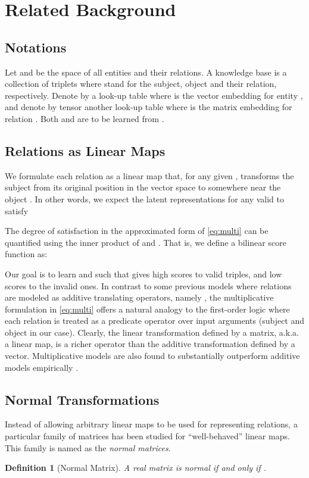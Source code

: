 \documentclass{article}
\newtheorem{definition}{Definition}[section]
\begin{document}
 \section{Related Background}
\label{sec:linearmaps}

\subsection{Notations}
Let  and  be the space of all entities and their relations.
A knowledge base  is a collection of triplets 
where  stand for the subject, object and their relation, respectively.
Denote by  a look-up table where  is the vector embedding for entity ,
and denote by tensor  another look-up table where  is the matrix embedding for relation .
Both  and  are to be learned from .

\subsection{Relations as Linear Maps}
We formulate each relation  as a linear map that,
for any given , transforms the subject  from its original position in the vector space to somewhere near the object .
In other words,
we expect the latent representations for any valid  to satisfy

The degree of satisfaction in the approximated form of  \eqref{eq:multi} can be quantified using
the inner product of  and .
That is, we define a bilinear score function as:

Our goal is to learn  and  such that
 gives high scores to valid triples, and low scores to the invalid ones. 
In contrast to some previous models \cite{bordes2013translating}
where relations are modeled as additive translating operators,
namely ,
the multiplicative formulation in \eqref{eq:multi} offers a natural analogy to the first-order logic where each relation is treated as a predicate operator over input arguments (subject and object in our case).  Clearly, the linear transformation defined by a matrix, a.k.a. a linear map, is a richer operator than the additive transformation defined by a vector.
Multiplicative models are also found to substantially outperform additive models
empirically \cite{nickel2011three, DBLP:journals/corr/YangYHGD14a}.

\subsection{Normal Transformations}
Instead of allowing arbitrary linear maps to be used for representing relations, a particular family of matrices has been studied for ``well-behaved'' linear maps.  This family is named as the \textit{normal matrices}.
\begin{definition}[Normal Matrix]
    A real matrix  is normal if and only if .
\end{definition}
\end{document}
